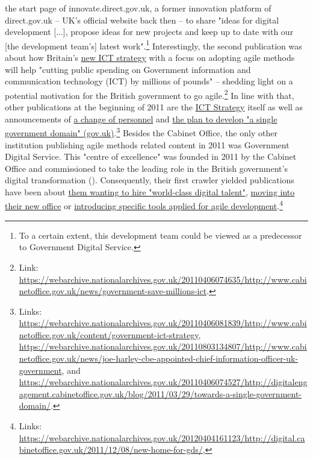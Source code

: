{}{the start page of innovate.direct.gov.uk}, a former innovation platform of direct.gov.uk – UK's official website back then – to share "ideas for digital development [...], propose ideas for new projects and keep up to date with our [the development team's] latest work".\footnote{To a certain extent, this development team could be viewed as a predecessor to Government Digital Service.} Interestingly, the second publication was about how Britain's \href{https://webarchive.nationalarchives.gov.uk/20110406081839/http://www.cabinetoffice.gov.uk/content/government-ict-strategy}{new ICT strategy} with a focus on adopting agile methods will help "cutting public spending on Government information and communication technology (ICT) by millions of pounds" – shedding light on a potential motivation for the British government to go agile.\footnote{Link: \url{https://webarchive.nationalarchives.gov.uk/20110406074635/http://www.cabinetoffice.gov.uk/news/government-save-millions-ict}.} In line with that, other publications at the beginning of 2011 are the \href{https://webarchive.nationalarchives.gov.uk/20110406081839/http://www.cabinetoffice.gov.uk/content/government-ict-strategy}{ICT Strategy} itself as well as announcements of \href{https://webarchive.nationalarchives.gov.uk/20110803134807/http://www.cabinetoffice.gov.uk/news/joe-harley-cbe-appointed-chief-information-officer-uk-government}{a change of personnel} and \href{https://webarchive.nationalarchives.gov.uk/20110406074527/http://digitalengagement.cabinetoffice.gov.uk/blog/2011/03/29/towards-a-single-government-domain/}{the plan to develop "a single government domain" (gov.uk)}.\footnote{Links: \url{https://webarchive.nationalarchives.gov.uk/20110406081839/http://www.cabinetoffice.gov.uk/content/government-ict-strategy}, \url{https://webarchive.nationalarchives.gov.uk/20110803134807/http://www.cabinetoffice.gov.uk/news/joe-harley-cbe-appointed-chief-information-officer-uk-government}, and \url{https://webarchive.nationalarchives.gov.uk/20110406074527/http://digitalengagement.cabinetoffice.gov.uk/blog/2011/03/29/towards-a-single-government-domain/}.} Besides the Cabinet Office, the only other institution publishing agile methods related content in 2011 was Government Digital Service. This "centre of excellence" was founded in 2011 by the Cabinet Office and commissioned to take the leading role in the British government's digital transformation (\cite{GovernmentDigitalService2020}). Consequently, their first crawler yielded publications have been about \href{https://webarchive.nationalarchives.gov.uk/20120404152514/http://digital.cabinetoffice.gov.uk/2011/10/25/the-second-lever/}{them wanting to hire "world-class digital talent"}, \href{https://webarchive.nationalarchives.gov.uk/20120404161123/http://digital.cabinetoffice.gov.uk/2011/12/08/new-home-for-gds/}{moving into their new office} or \href{https://webarchive.nationalarchives.gov.uk/20121102172608/http://digital.cabinetoffice.gov.uk/2011/09/19/introducing-the-needotron-working-out-the-shape-of-the-product/}{introducing specific tools applied for agile development}.\footnote{Links: \url{https://webarchive.nationalarchives.gov.uk/20120404161123/http://digital.cabinetoffice.gov.uk/2011/12/08/new-home-for-gds/}, }
